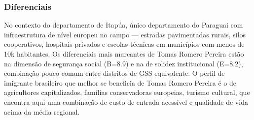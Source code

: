 \subsubsection*{Diferenciais}\label{dif-tomas-romero-pereira-0724}
No contexto do departamento de Itapúa, único departamento do Paraguai com infraestrutura de nível europeu no campo — estradas pavimentadas rurais, silos cooperativos, hospitais privados e escolas técnicas em municípios com menos de 10k habitantes. Os diferenciais mais marcantes de Tomas Romero Pereira estão na dimensão de segurança social (B=8.9) e na de solidez institucional (E=8.2), combinação pouco comum entre distritos de GSS equivalente. O perfil de imigrante brasileiro que melhor se beneficia de Tomas Romero Pereira é o de agricultores capitalizados, famílias conservadoras europeias, turismo cultural, que encontra aqui uma combinação de custo de entrada acessível e qualidade de vida acima da média regional.
